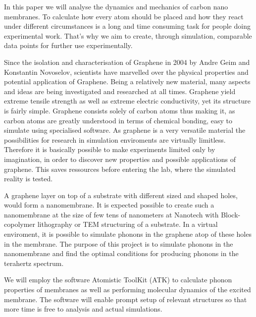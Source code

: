 
In this paper we will analyse the dynamics and mechanics of carbon nano membranes. To calculate how every atom should be placed and how they react under different circumstances is a long and time consuming task for people doing experimental work. That's why we aim to create, through simulation, comparable data points for further use experimentally.

Since the isolation and characterisation of
Graphene in 2004 by Andre Geim and
Konstantin Novoselov, scientists have marvelled over the physical properties and potential
application of Graphene. Being a relatively new material, many aspects and ideas are being
investigated and researched at all times. Graphene yield extreme tensile strength as well as
extreme electric conductivity, yet its structure is fairly simple. Graphene consists solely of
carbon atoms thus making it, as carbon atoms are greatly understood in terms of chemical
bonding, easy to simulate using specialised software. As graphene is a very versatile
material the possibilities for research in simulation enviroments are virtually limitless.
Therefore it is basically possible to make experiments limited only by imagination, in order
to discover new properties and possible applications of graphene. This saves ressources
before entering the lab, where the simulated reality is tested.

A graphene layer on top of a substrate with different sized and shaped holes, would
form a nanomembrane. It is expected possible to create such a nanomembrane at the
size of few tens of nanometers at Nanotech with Block-copolymer lithography or TEM
structuring of a substrate. In a virtual enviroment, it is possible to simulate phonons
in the graphene atop of these holes in the membrane. The purpose of this project is to
simulate phonons in the nanomembrane and find the optimal conditions for producing
phonons in the terahertz spectrum.

We will employ the software Atomistic ToolKit (ATK) to calculate phonon properties
of membranes as well as performing molecular dynamics of the excited membrane. The
software will enable prompt setup of relevant structures so that more time is free to analysis
and actual simulations.
